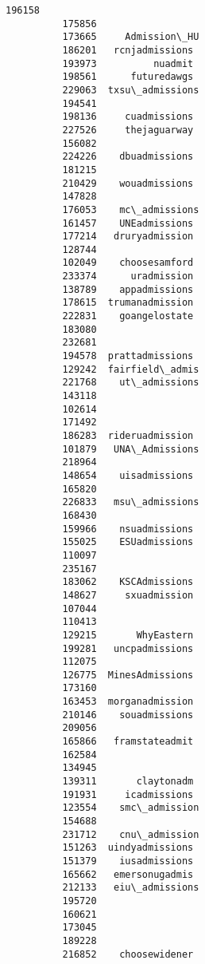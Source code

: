 \documentclass[11pt]{article}
\begin{document}
\begin{Verbatim}[commandchars=\\\{\}]
          196158                   
          175856                   
          173665     Admission\_HU  
          186201   rcnjadmissions  
          193973          nuadmit  
          198561      futuredawgs  
          229063  txsu\_admissions  
          194541                   
          198136     cuadmissions  
          227526     thejaguarway  
          156082                   
          224226    dbuadmissions  
          181215                   
          210429    wouadmissions  
          147828                   
          176053    mc\_admissions  
          161457    UNEadmissions  
          177214   druryadmission  
          128744                   
          102049    choosesamford  
          233374      uradmission  
          138789    appadmissions  
          178615  trumanadmission  
          222831    goangelostate  
          183080                   
          232681                   
          194578  prattadmissions  
          129242  fairfield\_admis  
          221768    ut\_admissions  
          143118                   
          102614                   
          171492                   
          186283  rideruadmission  
          101879   UNA\_Admissions  
          218964                   
          148654    uisadmissions  
          165820                   
          226833   msu\_admissions  
          168430                   
          159966    nsuadmissions  
          155025    ESUadmissions  
          110097                   
          235167                   
          183062    KSCAdmissions  
          148627     sxuadmission  
          107044                   
          110413                   
          129215       WhyEastern  
          199281   uncpadmissions  
          112075                   
          126775  MinesAdmissions  
          173160                   
          163453  morganadmission  
          210146    souadmissions  
          209056                   
          165866   framstateadmit  
          162584                   
          134945                   
          139311       claytonadm  
          191931     icadmissions  
          123554    smc\_admission  
          154688                   
          231712    cnu\_admission  
          151263  uindyadmissions  
          151379    iusadmissions  
          165662   emersonugadmis  
          212133   eiu\_admissions  
          195720                   
          160621                   
          173045                   
          189228                   
          216852    choosewidener  

\end{Verbatim}
\end{document}
